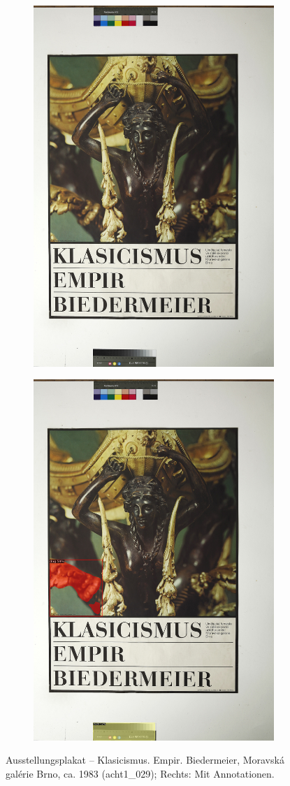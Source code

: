 \documentclass[a4paper,12pt,ngerman]{article}
\begin{document}
\newpage
\begin{landscape}
\begin{figure}[ht]
	\begin{subfigure}[b]{0.5\linewidth}
	\centering
	\includegraphics[height=\linewidth]{Abbildung_36_(acht1_029)}
	\end{subfigure}
	\begin{subfigure}[b]{0.5\linewidth}
	\centering
	\includegraphics[height=\linewidth]{Abbildung_36_(acht1_029)_with_detections}
	\end{subfigure}
	\caption{Ausstellungsplakat – Klasicismus. Empir. Biedermeier, Moravská galérie Brno, ca. 1983 (acht1\_029); Rechts: Mit Annotationen.}
\end{figure}
\end{landscape}
\end{document}
